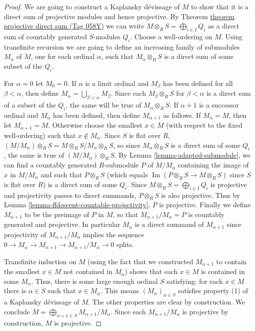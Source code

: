 \documentclass{amsart}
\theoremstyle{plain}
\theoremstyle{definition}
\theoremstyle{remark}
\numberwithin{equation}{subsection}
\def\Im{\mathop{\mathrm{Im}}}
\begin{document}
\begin{proof}
We are going to construct a Kaplansky d\'evissage of $M$ to show that it is a
direct sum of projective modules and hence projective.  By Theorem
\href{https://stacks.math.columbia.edu/tag/058Y}{theorem projective direct sum (Tag 058Y)} we can write $M \otimes_R S =
\bigoplus_{i \in I} Q_i$ as a direct sum of countably generated $S$-modules
$Q_i$.  Choose a well-ordering on $M$.  Using transfinite recursion we are going
to define an increasing family of submodules $M_{\alpha}$ of $M$, one for each
ordinal $\alpha$, such that $M_{\alpha} \otimes_R S$ is a direct sum of some
subset of the $Q_i$.

\medskip\noindent
For $\alpha = 0$ let $M_0 = 0$.  If $\alpha$ is a limit ordinal and $M_{\beta}$
has been defined for all $\beta < \alpha$, then define $M_\alpha =
\bigcup_{\beta < \alpha} M_{\beta}$.  Since each $M_{\beta} \otimes_R S$ for
$\beta < \alpha$ is a direct sum of a subset of the $Q_i$, the same will be
true of $M_{\alpha} \otimes_R S$.  If $\alpha + 1$ is a successor ordinal and
$M_{\alpha}$ has been defined, then define $M_{\alpha + 1}$ as follows.  If
$M_{\alpha} = M$, then let $M_{\alpha +1} = M$.  Otherwise choose the smallest
$x \in M$ (with respect to the fixed well-ordering) such that $x \notin
M_{\alpha}$. Since $S$ is flat over $R$, $(M/M_{\alpha}) \otimes_R S = M
\otimes_R S/M_{\alpha} \otimes_R S$, so since $M_{\alpha} \otimes_R S$ is
a direct sum of some $Q_i$, the same is true of $(M/M_{\alpha}) \otimes_R
S$.   By Lemma \ref{lemma-adapted-submodule}, we can find a countably generated
$R$-submodule $P$ of $M/M_{\alpha}$ containing the image of $x$ in
$M/M_{\alpha}$ and such that $P \otimes_R S$ (which equals $\Im(P
\otimes_R S \to M \otimes_R S)$ since $S$ is flat over $R$) is a
direct sum of some $Q_i$. Since $M \otimes_R S = \bigoplus_{i \in I} Q_i$
is projective and projectivity passes to direct summands, $P \otimes_R S$ is
also projective.  Thus by Lemma \ref{lemma-ffdescent-countable-projectivity},
$P$ is projective.  Finally we define $M_{\alpha + 1}$ to be the preimage of $P$
in $M$, so that $M_{\alpha + 1}/M_{\alpha} = P$ is countably generated and
projective.  In particular $M_{\alpha}$ is a direct summand of $M_{\alpha + 1}$
since projectivity of $M_{\alpha + 1}/M_{\alpha}$ implies the sequence $0
\to M_{\alpha} \to M_{\alpha + 1} \to
M_{\alpha + 1}/M_{\alpha} \to 0$ splits.

\medskip\noindent
Transfinite induction on $M$ (using the fact that we constructed
$M_{\alpha + 1}$ to contain the smallest $x \in M$ not contained in
$M_{\alpha}$) shows that
each $x \in M$ is contained in some $M_{\alpha}$.  Thus, there is some large
enough ordinal $S$ satisfying: for each $x \in M$ there is $\alpha \in S$ such
that $x \in M_{\alpha}$.  This means $(M_{\alpha})_{\alpha \in S}$ satisfies
property (1) of a Kaplansky d\'evissage of $M$.  The other properties are clear
by construction.  We conclude
$M = \bigoplus_{\alpha + 1 \in S} M_{\alpha + 1}/M_{\alpha}$.
Since each $M_{\alpha + 1}/M_{\alpha}$ is projective
by construction, $M$ is projective.
\end{proof}
\end{document}
